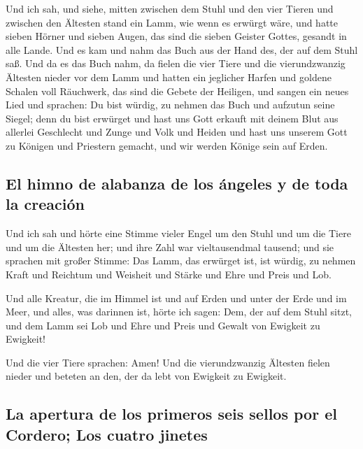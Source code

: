  Und ich sah, und siehe, mitten zwischen dem Stuhl und den
vier Tieren und zwischen den Ältesten stand ein Lamm, wie wenn es
erwürgt wäre, und hatte sieben Hörner und sieben Augen, das sind die
sieben Geister Gottes, gesandt in alle Lande.  Und es kam
und nahm das Buch aus der Hand des, der auf dem Stuhl saß.
 Und da es das Buch nahm, da fielen die vier Tiere und die
vierundzwanzig Ältesten nieder vor dem Lamm und hatten ein jeglicher
Harfen und goldene Schalen voll Räuchwerk, das sind die Gebete der
Heiligen,  und sangen ein neues Lied und sprachen: Du bist
würdig, zu nehmen das Buch und aufzutun seine Siegel; denn du bist
erwürget und hast uns Gott erkauft mit deinem Blut aus allerlei
Geschlecht und Zunge und Volk und Heiden  und hast uns
unserem Gott zu Königen und Priestern gemacht, und wir werden Könige
sein auf Erden.

\hypertarget{el-himno-de-alabanza-de-los-uxe1ngeles-y-de-toda-la-creaciuxf3n}{%
\subsection{El himno de alabanza de los ángeles y de toda la
creación}\label{el-himno-de-alabanza-de-los-uxe1ngeles-y-de-toda-la-creaciuxf3n}}

 Und ich sah und hörte eine Stimme vieler Engel um den
Stuhl und um die Tiere und um die Ältesten her; und ihre Zahl war
vieltausendmal tausend;  und sie sprachen mit großer
Stimme: Das Lamm, das erwürget ist, ist würdig, zu nehmen Kraft und
Reichtum und Weisheit und Stärke und Ehre und Preis und Lob.

 Und alle Kreatur, die im Himmel ist und auf Erden und
unter der Erde und im Meer, und alles, was darinnen ist, hörte ich
sagen: Dem, der auf dem Stuhl sitzt, und dem Lamm sei Lob und Ehre und
Preis und Gewalt von Ewigkeit zu Ewigkeit!

 Und die vier Tiere sprachen: Amen! Und die
vierundzwanzig Ältesten fielen nieder und beteten an den, der da lebt
von Ewigkeit zu Ewigkeit.

\hypertarget{la-apertura-de-los-primeros-seis-sellos-por-el-cordero-los-cuatro-jinetes}{%
\subsection{La apertura de los primeros seis sellos por el Cordero; Los
cuatro
jinetes}\label{la-apertura-de-los-primeros-seis-sellos-por-el-cordero-los-cuatro-jinetes}}

